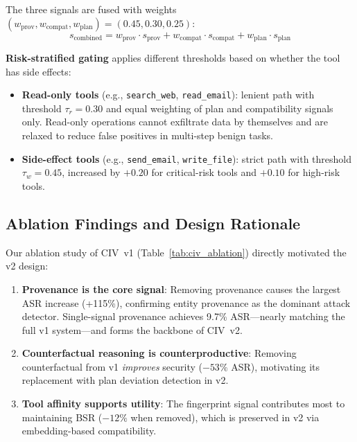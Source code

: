 The three signals are fused with weights $(w_{\text{prov}}, w_{\text{compat}}, w_{\text{plan}}) = (0.45, 0.30, 0.25)$:
\begin{equation}
    s_{\text{combined}} = w_{\text{prov}} \cdot s_{\text{prov}} + w_{\text{compat}} \cdot s_{\text{compat}} + w_{\text{plan}} \cdot s_{\text{plan}}
\end{equation}

\textbf{Risk-stratified gating} applies different thresholds based on whether the tool has side effects:
\begin{itemize}
    \item \textbf{Read-only tools} (e.g., \texttt{search\_web}, \texttt{read\_email}): lenient path with threshold $\tau_r = 0.30$ and equal weighting of plan and compatibility signals only. Read-only operations cannot exfiltrate data by themselves and are relaxed to reduce false positives in multi-step benign tasks.
    \item \textbf{Side-effect tools} (e.g., \texttt{send\_email}, \texttt{write\_file}): strict path with threshold $\tau_w = 0.45$, increased by $+0.20$ for critical-risk tools and $+0.10$ for high-risk tools.
\end{itemize}

\subsection{Ablation Findings and Design Rationale}
\label{sec:civ_ablation_findings}

Our ablation study of CIV~v1 (Table~\ref{tab:civ_ablation}) directly motivated the v2 design:
\begin{enumerate}
    \item \textbf{Provenance is the core signal}: Removing provenance causes the largest ASR increase (+115\%), confirming entity provenance as the dominant attack detector.
    Single-signal provenance achieves 9.7\% ASR---nearly matching the full v1 system---and forms the backbone of CIV~v2.
    \item \textbf{Counterfactual reasoning is counterproductive}: Removing counterfactual from v1 \emph{improves} security ($-53\%$ ASR), motivating its replacement with plan deviation detection in v2.
    \item \textbf{Tool affinity supports utility}: The fingerprint signal contributes most to maintaining BSR ($-12\%$ when removed), which is preserved in v2 via embedding-based compatibility.
\end{enumerate}

